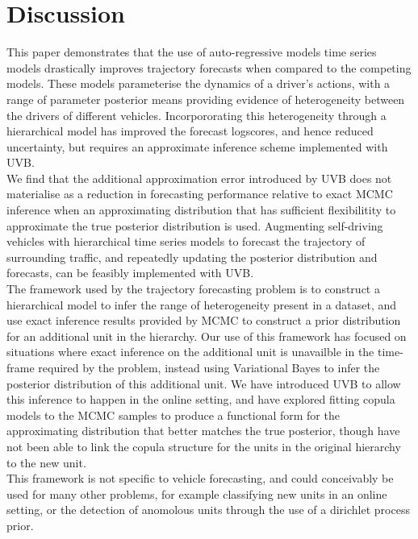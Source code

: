 \documentclass[12pt,a4paper]{article}\usepackage[]{graphicx}\usepackage[]{color}
\begin{document}
\newpage


\section{Discussion}
\label{sec:disc}
This paper demonstrates that the use of auto-regressive models time series models drastically improves trajectory forecasts when compared to the competing models.  These models parameterise the dynamics of a driver's actions, with a range of parameter posterior means providing evidence of heterogeneity between the drivers of different vehicles. Incorpororating this heterogeneity through a hierarchical model has improved the forecast logscores, and hence reduced uncertainty, but requires an approximate inference scheme implemented with UVB. 
\\

We find that the additional approximation error introduced by UVB does not materialise as a reduction in forecasting performance relative to exact MCMC inference when an approximating distribution that has sufficient flexibilitity to approximate the true posterior distribution is used. Augmenting self-driving vehicles with hierarchical time series models to forecast the trajectory of surrounding traffic, and repeatedly updating the posterior distribution and forecasts, can be feasibly implemented with UVB.
\\

The framework used by the trajectory forecasting problem is to construct a hierarchical model to infer the range of heterogeneity present in a dataset, and use exact inference results provided by MCMC to construct a prior distribution for an additional unit in the hierarchy. Our use of this framework has focused on situations where exact inference on the additional unit is unavailble in the time-frame required by the problem, instead using Variational Bayes to infer the posterior distribution of this additional unit. We have introduced UVB to allow this inference to happen in the online setting, and have explored fitting copula models to the MCMC samples to produce a functional form for the approximating distribution that better matches the true posterior, though have not been able to link the copula structure for the units in the original hierarchy to the new unit.
\\

This framework is not specific to vehicle forecasting, and could conceivably be used for many other problems, for example classifying new units in an online setting, or the detection of anomolous units through the use of a dirichlet process prior.
\\
\end{document}
